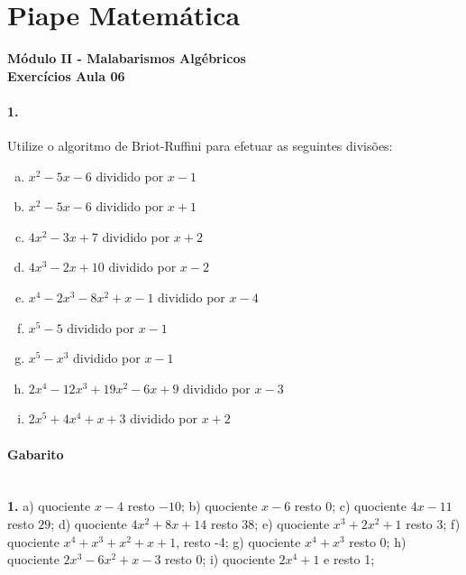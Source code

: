 \documentclass[a4paper,12pt]{article}
\begin{document}
 
  
\section*{Piape Matemática} 
\textbf{Módulo II - Malabarismos Algébricos}\\
\textbf{Exercícios Aula 06}         
\begin{multicols}{2}
\paragraph*{1.} Utilize o algoritmo de Briot-Ruffini para efetuar as seguintes divisões:
\begin{enumerate}[a)]
\item $x^2 -5x-6$ dividido por $x-1$
\item $x^2 -5x-6$ dividido por $x+1$
\item $4x^2 -3x +7$ dividido por $x+2$
\item $4x^3-2x+10$ dividido por $x-2$
\item $x^4 -2x^3 -8x^2 +x -1$ dividido por $x-4$
\item $x^5 - 5$ dividido por $x - 1$
\item $x^5 - x^3$ dividido por $x - 1$
\item $2 x^{4} - 12 x^{3} + 19 x^{2} - 6 x + 9$ dividido por $x - 3$
\item $2 x^{5} + 4 x^{4} + x + 3$ dividido por $x + 2$
\end{enumerate}
\vspace*{8cm}
\end{multicols}
 
\vspace*{\fill}
{\footnotesize
\paragraph*{Gabarito} \hspace*{\fill}\\
\textbf{1.} a) quociente $x-4$ resto $-10$; b) quociente $x-6$ resto $0$; 
c) quociente $4x-11$ resto $29$;  d) quociente $4x^2 + 8x + 14$ resto $38$;
e) quociente $x^3 + 2x^2 + 1$ resto $3$;
f) quociente $x^4 + x^3 + x^2 + x + 1 $, resto -4; g) quociente $x^4 +x^3$ resto 0; h) quociente $2x^3 - 6x^2 + x -3$ resto 0; i) quociente $2x^4 + 1$ e resto 1;  
}
\end{document}
